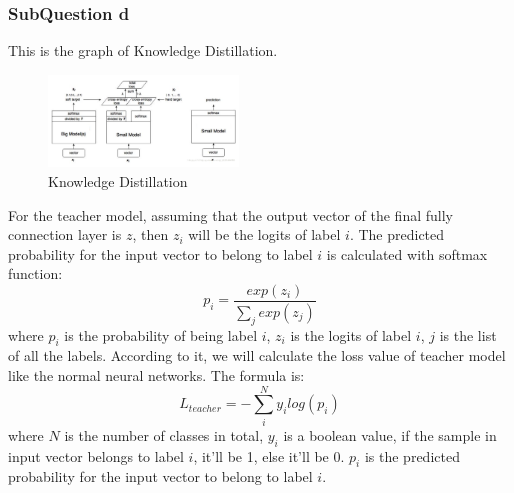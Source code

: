 \documentclass[conference]{IEEEtran}
\begin{document}
\subsubsection{SubQuestion d}
This is the graph of Knowledge Distillation.
\begin{figure}[h] 
    \centering
    \includegraphics[width=0.45\textwidth]{./graphs/KD.png}
    \caption{Knowledge Distillation}
    \label{Fig.t1q3e}
\end{figure}
For the teacher model, assuming that the output vector of the final fully connection layer is $z$, then $z_{i}$ will be the logits of label $i$. 
The predicted probability for the input vector to belong to label $i$ is calculated with softmax function:
$$p_{i}=\frac{exp(z_{i})}{\sum_{j}exp(z_{j})}$$
where $p_{i}$ is the probability of being label $i$, $z_{i}$ is the logits of label $i$, $j$ is the list of all the labels.
According to it, we will calculate the loss value of teacher model like the normal neural networks. The formula is:
$$L_{teacher}=-\sum_{i}^{N}y_{i}log(p_{i})$$
where $N$ is the number of classes in total, $y_{i}$ is a boolean value, if the sample in input vector belongs to label $i$, it'll be 1, else it'll be 0. $p_{i}$ is the predicted probability for the input vector to belong to label $i$.
\par
\end{document}
